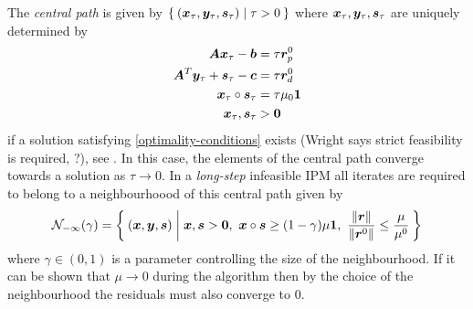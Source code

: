 The \emph{central path} is given by \(\Set{(\bm{x}_\tau, \bm{y}_\tau, \bm{s}_\tau) | \tau > 0}\) where \(\bm{x}_\tau, \bm{y}_\tau, \bm{s}_\tau\) are uniquely determined by
\begin{subequations}
  \begin{align}
    \bm{A}\bm{x}_\tau - \bm{b} &= \tau \bm{r}_p^0 \\
    \bm{A}^T \bm{y}_\tau + \bm{s}_\tau - \bm{c} &= \tau \bm{r}_d^0 \\
    \bm{x}_\tau \circ \bm{s}_\tau &= \tau \mu_0 \bm{1} \\
    \bm{x}_\tau, \bm{s}_\tau &> \bm{0}
  \end{align}
\end{subequations}
if a solution satisfying \cref{optimality-conditions} exists (Wright says strict feasibility is required, ?), see \cite{Mizuno-PolynomialTimeConvergenceInexactIPM}.
In this case, the elements of the central path converge towards a solution as \(\tau \to 0\).
In a \emph{long-step} infeasible IPM all iterates are required to belong to a neighbourhoood of this central path given by
\begin{equation}
  \mathcal{N}_{-\infty}(\gamma) = \Set{ (\vek{x}, \vek{y}, \vek{s}) | \vek{x}, \vek{s} > \vek{0}, \ \vek{x} \circ \vek{s} \geq (1 - \gamma) \mu \vek{1}, \ \frac{\norm{\vek{r}}}{\norm{\vek{r}^0}} \leq \frac{\mu}{\mu^0} }
\end{equation}
where \(\gamma \in (0, 1)\) is a parameter controlling the size of the neighbourhood.
If it can be shown that \(\mu \to 0\) during the algorithm then by the choice of the neighbourhood the residuals must also converge to \(0\).

